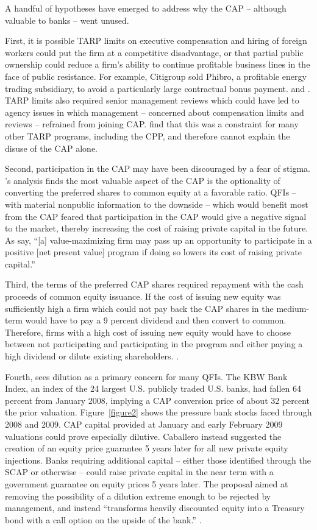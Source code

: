 \documentclass[12pt]{article}
\begin{document}
A handful of hypotheses have emerged to address why the CAP -- although valuable to banks -- went unused.

First, it is possible TARP limits on executive compensation and hiring of foreign workers could put the firm at a competitive disadvantage, or that partial public ownership could reduce a firm's ability to continue profitable business lines in the face of public resistance. For example, Citigroup sold Phibro, a profitable energy trading subsidiary, to avoid a particularly large contractual bonus payment. \citep{GW} and \citep{Dash}. TARP limits also required senior management reviews which could have led to agency issues in which management -- concerned about compensation limits and reviews -- refrained from joining CAP. \citet{GW} find that this was a constraint for many other TARP programs, including the CPP, and therefore cannot explain the disuse of the CAP alone.

Second, participation in the CAP may have been discouraged by a fear of stigma. \citet{GW}'s analysis finds the most valuable aspect of the CAP is the optionality of converting the preferred shares to common equity at a favorable ratio. QFIs -- with material nonpublic information to the downside -- which would benefit most from the CAP feared that participation in the CAP would give a negative signal to the market, thereby increasing the cost of raising private capital in the future. As \citet{GW} say, ``[a] value-maximizing firm may pass up an opportunity to participate in a positive [net present value] program if doing so lowers its cost of raising private capital.''

Third, the terms of the preferred CAP shares required repayment with the cash proceeds of common equity issuance. If the cost of issuing new equity was sufficiently high a firm which could not pay back the CAP shares in the medium-term would have to pay a 9 percent dividend and then convert to common. Therefore, firms with a high cost of issuing new equity would have to choose between not participating and participating in the program and either paying a high dividend or dilute existing shareholders. \citep{GW}.

Fourth, \citet{Caballero} sees dilution as a primary concern for many QFIs. The KBW Bank Index, an index of the 24 largest U.S. publicly traded U.S. banks, had fallen 64 percent from January 2008, implying a CAP conversion price of about 32 percent the prior valuation. Figure~\ref{figure2} shows the pressure bank stocks faced through 2008 and 2009. CAP capital provided at January and early February 2009 valuations could prove especially dilutive. Caballero instead suggested the creation of an equity price guarantee 5 years later for all new private equity injections. Banks requiring additional capital -- either those identified through the SCAP or otherwise -- could raise private capital in the near term with a government guarantee on equity prices 5 years later. The proposal aimed at removing the possibility of a dilution extreme enough to be rejected by management, and instead ``transforms heavily discounted equity into a Treasury bond with a call option on the upside of the bank.'' \citep{Caballero}.
\end{document}
